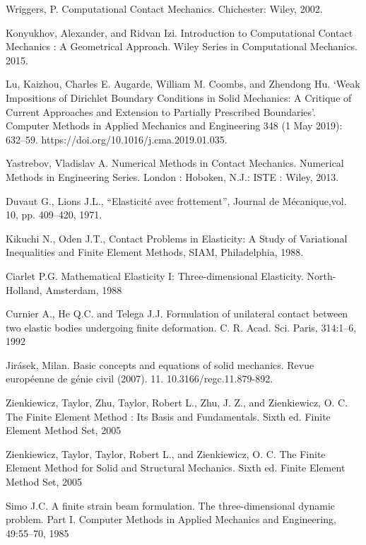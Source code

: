 \documentclass{article}
\begin{document}
     

 

\newpage
\begin{thebibliography}{99}
 Wriggers, P. Computational Contact Mechanics. Chichester: Wiley, 2002.

 Konyukhov, Alexander, and Ridvan Izi. Introduction to Computational Contact Mechanics : A Geometrical Approach. Wiley Series in Computational Mechanics. 2015.

 Lu, Kaizhou, Charles E. Augarde, William M. Coombs, and Zhendong Hu. ‘Weak Impositions of Dirichlet Boundary Conditions in Solid Mechanics: A Critique of Current Approaches and Extension to Partially Prescribed Boundaries’. Computer Methods in Applied Mechanics and Engineering 348 (1 May 2019): 632–59. https://doi.org/10.1016/j.cma.2019.01.035.

 Yastrebov, Vladislav A. Numerical Methods in Contact Mechanics. Numerical Methods in Engineering Series. London : Hoboken, N.J.: ISTE : Wiley, 2013.

 Duvaut G., Lions J.L., “Elasticité avec frottement”, Journal de Mécanique,vol. 10, pp. 409–420, 1971.

 Kikuchi N., Oden J.T., Contact Problems in Elasticity: A Study of Variational Inequalities and Finite Element Methods, SIAM, Philadelphia, 1988.

 Ciarlet P.G. Mathematical Elasticity I: Three-dimensional Elasticity. North-Holland, Amsterdam, 1988

 Curnier A., He Q.C. and Telega J.J. Formulation of unilateral contact between two elastic bodies undergoing finite deformation. C. R. Acad. Sci. Paris,
314:1–6, 1992

 Jirásek, Milan. Basic concepts and equations of solid mechanics. Revue européenne de génie civil (2007). 11. 10.3166/regc.11.879-892.

 Zienkiewicz, Taylor, Zhu, Taylor, Robert L., Zhu, J. Z., and Zienkiewicz, O. C. The Finite Element Method : Its Basis and Fundamentals. Sixth ed. Finite Element Method Set, 2005

 Zienkiewicz, Taylor, Taylor, Robert L., and Zienkiewicz, O. C. The Finite Element Method for Solid and Structural Mechanics. Sixth ed. Finite Element Method Set, 2005

 Simo J.C. A finite strain beam formulation. The three-dimensional dynamic
problem. Part I. Computer Methods in Applied Mechanics and Engineering,
49:55–70, 1985


\end{thebibliography}
\end{document}
